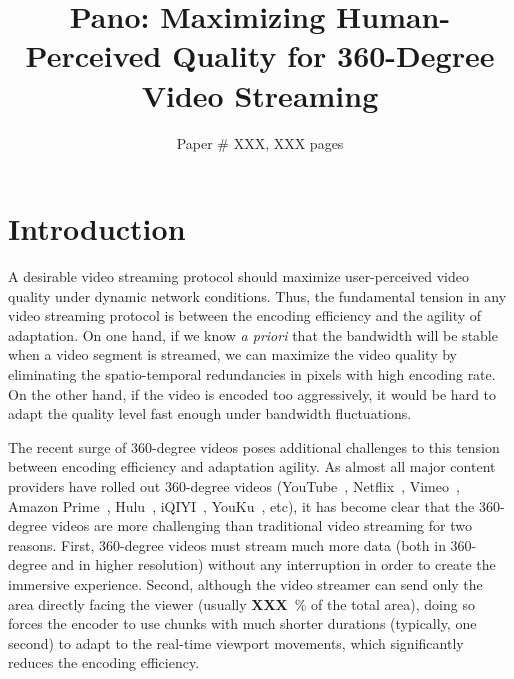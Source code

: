 \documentclass[sigconf]{acmart}
\newcommand{\fillme}{{\bf XXX}~}
\newcommand{\name}{{Pano}\xspace}
\begin{document}
\title{\name: Maximizing Human-Perceived Quality for 360-Degree Video Streaming}


\author{Paper \# XXX, XXX pages}

\renewcommand{\shortauthors}{X.et al.}

\begin{abstract}

\end{abstract}

\maketitle

\section{Introduction}


A desirable video streaming protocol should maximize user-perceived video quality under dynamic network conditions.
Thus, the fundamental tension in any video streaming protocol is between the encoding efficiency and the agility of adaptation.
On one hand, if we know {\em a priori} that the bandwidth will be stable when a video segment is streamed, we can maximize the video quality by eliminating the spatio-temporal redundancies in pixels with high encoding rate.
On the other hand, if the video is encoded too aggressively, it would be hard to adapt the quality level fast enough under bandwidth fluctuations.


The recent surge of 360-degree videos poses additional challenges to this tension between encoding efficiency and adaptation agility. 
As almost all major content providers have rolled out 360-degree videos (YouTube~\cite{??}, Netflix~\cite{??}, Vimeo~\cite{??}, Amazon Prime~\cite{??}, Hulu~\cite{??}, iQIYI~\cite{??}, YouKu~\cite{??}, etc), 
it has become clear that the 360-degree videos are more challenging than traditional video streaming for two reasons.
First, 360-degree videos must stream much more data (both in 360-degree and in higher resolution) without any interruption in order to create the immersive experience.
Second, although the video streamer can send only the area directly facing the viewer (usually \fillme\% of the total area), doing so forces the encoder to use chunks with much shorter durations (typically, one second) to adapt to the real-time viewport movements, which significantly reduces the encoding efficiency.
\end{document}
